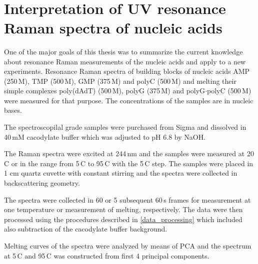 \\
\section{Interpretation of UV resonance Raman spectra of nucleic acids}
\label{interpretation}

\newlength{\assignwnl}
\settowidth{\assignwnl}{0000}
\newlength{\assignwnil}
\settowidth{\assignwnil}{(000)}
\newlength{\assignwnspl}
\setlength{\assignwnspl}{0.2cm}
\newlength{\assigntabrowindent}
\setlength{\assigntabrowindent}{.7em}


One of the major goals of this thesis was to summarize the current knowledge
about resonance Raman measurements of the nucleic acids and apply to a new
experiments.
Resonance Raman spectra of building blocks of nucleic acids AMP (250\,M),
TMP (500\,M), GMP (375\,M) and polyC (500\,M) and melting their
simple complexes poly(dAdT) (500\,M), polyG (375\,M) and
polyG$\cdot$polyC (500\,M) were measured for that purpose.
The concentrations of the samples are in nucleic bases.

The spectroscopilal grade samples were purchased from Sigma and dissolved in
40\,mM cacodylate buffer which was adjusted to pH 6.8 by NaOH.

The Raman spectra were excited at 244\,nm and the samples were measured at
20\,\textdegree{}C or in the range from 5\,\textdegree{}C to 95\,\textdegree{}C
with the 5\,\textdegree{}C step. The samples were placed in 1 cm quartz cuvette
with constant stirring and the spectra were collected in backscattering
geometry.

The spectra were collected in 60 or 5 subsequent 60\,s frames for measurement
at one temperature or measurement of melting, respectively.
The data were then processed using the procedures described in
\cref{data_processing}
which included also subtraction of the cacodylate buffer background.

Melting curves of the spectra were analyzed by means of PCA and the spectrum
at 5\,\textdegree{}C and 95\,\textdegree{}C was constructed from first 4
principal components.

